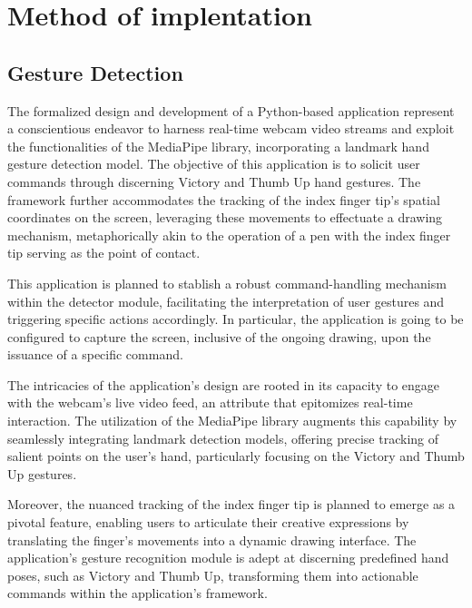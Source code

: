 \documentclass[journal]{IEEEtran}
\begin{document}


\section{Method of implentation}
\subsection*{Gesture Detection}
The formalized design and development of a Python-based application represent a conscientious endeavor to harness real-time webcam 
video streams and exploit the functionalities of the MediaPipe library, incorporating a landmark hand gesture detection model. 
The objective of this application is to solicit user commands through discerning Victory and Thumb Up hand gestures. The framework 
further accommodates the tracking of the index finger tip's spatial coordinates on the screen, leveraging these movements to 
effectuate a drawing mechanism, metaphorically akin to the operation of a pen with the index finger tip serving as the point of contact.

This application is planned to stablish a robust command-handling mechanism within the detector module, facilitating the interpretation of user 
gestures and triggering specific actions accordingly. In particular, the application is going to be configured to capture the screen, inclusive 
of the ongoing drawing, upon the issuance of a specific command.

The intricacies of the application's design are rooted in its capacity to engage with the webcam's live video feed, an attribute that 
epitomizes real-time interaction. The utilization of the MediaPipe library augments this capability by seamlessly integrating landmark 
detection models, offering precise tracking of salient points on the user's hand, particularly focusing on the Victory and Thumb Up gestures.

Moreover, the nuanced tracking of the index finger tip is planned to emerge as a pivotal feature, enabling users to articulate their creative 
expressions by translating the finger's movements into a dynamic drawing interface. The application’s gesture recognition module is 
adept at discerning predefined hand poses, such as Victory and Thumb Up, transforming them into actionable commands within the 
application's framework.
\end{document}
